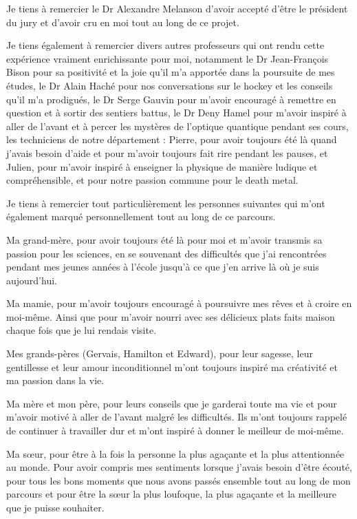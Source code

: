 \begin{onehalfspace}
    \noindent Je tiens à remercier le Dr Alexandre Melanson d'avoir accepté d'être le président du jury et d'avoir cru en moi tout au long de ce projet.

    \noindent Je tiens également à remercier divers autres professeurs qui ont rendu cette expérience vraiment enrichissante pour moi, notamment le Dr Jean-François Bison pour sa positivité et la joie qu'il m'a apportée dans la poursuite de mes études, le Dr Alain Haché pour nos conversations sur le hockey et les conseils qu'il m'a prodigués, le Dr Serge Gauvin pour m'avoir encouragé à remettre en question et à sortir des sentiers battus, le Dr Deny Hamel pour m'avoir inspiré à aller de l'avant et à percer les mystères de l'optique quantique pendant ses cours, les techniciens de notre département : Pierre, pour avoir toujours été là quand j'avais besoin d'aide et pour m'avoir toujours fait rire pendant les pauses, et Julien, pour m'avoir inspiré à enseigner la physique de manière ludique et compréhensible, et pour notre passion commune pour le death metal. 

    \noindent Je tiens à remercier tout particulièrement les personnes suivantes qui m'ont également marqué personnellement tout au long de ce parcours.

    \noindent Ma grand-mère, pour avoir toujours été là pour moi et m'avoir transmis sa passion pour les sciences, en se souvenant des difficultés que j'ai rencontrées pendant mes jeunes années à l'école jusqu'à ce que j'en arrive là où je suis aujourd'hui.

    \noindent Ma mamie, pour m'avoir toujours encouragé à poursuivre mes rêves et à croire en moi-même. Ainsi que pour m'avoir nourri avec ses délicieux plats faits maison chaque fois que je lui rendais visite. 

    \noindent Mes grands-pères (Gervais, Hamilton et Edward), pour leur sagesse, leur gentillesse et leur amour inconditionnel m'ont toujours inspiré ma créativité et ma passion dans la vie.

    \noindent Ma mère et mon père, pour leurs conseils que je garderai toute ma vie et pour m'avoir motivé à aller de l'avant malgré les difficultés. Ils m'ont toujours rappelé de continuer à travailler dur et m'ont inspiré à donner le meilleur de moi-même.

    \noindent Ma sœur, pour être à la fois la personne la plus agaçante et la plus attentionnée au monde. Pour avoir compris mes sentiments lorsque j'avais besoin d'être écouté, pour tous les bons moments que nous avons passés ensemble tout au long de mon parcours et pour être la sœur la plus loufoque, la plus agaçante et la meilleure que je puisse souhaiter. 


\end{onehalfspace}
